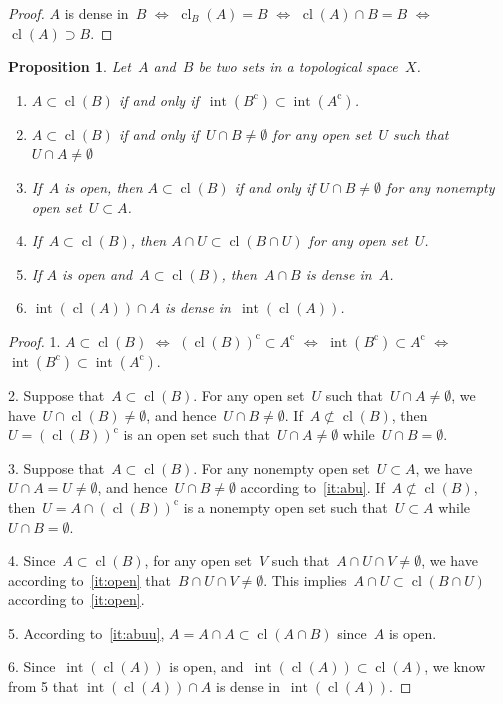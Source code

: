 \documentclass[11pt,a4paper]{article}  %
\newtheorem{proposition}{Proposition}[section]
\theoremstyle{definition}
\newcommand{\co}{{\mathrm{c}}}
\newcommand{\ie}{{i.e.}}
\DeclareMathOperator{\inter}{int}
\DeclareMathOperator{\cl}{cl}
\numberwithin{equation}{section}
\begin{document}
\begin{proof}
  $A$ is dense in~$B$ $\Leftrightarrow $ $\cl_B(A) = B$ $\Leftrightarrow$ $\cl(A)\cap B = B$
  $\Leftrightarrow$ $\cl(A) \supset B$.
\end{proof}

\begin{proposition}
  \label{prop:dense}
  Let~$A$ and~$B$ be two sets in a topological space~$X$.
  \begin{enumerate}
    \item $A\subset \cl(B)$ if and only if~$\inter(B^\co ) \subset \inter(A^\co)$.
    \item \label{it:abu} $A \subset \cl(B)$ if and only if~$U\cap B \neq \emptyset$ for any open
      set~$U$ such that~$U \cap  A \neq \emptyset$
    \item \label{it:open} If~$A$ is open, then $A\subset \cl(B)$ if and only if $U\cap B \neq \emptyset$ for any
    nonempty open set~$U\subset A$.
  \item \label{it:abuu} If~$A\subset \cl(B)$, then $A\cap U \subset \cl(B\cap U)$ for any open set~$U$.
   \item \label{it:dense}If $A$ is open and~$A\subset \cl(B)$, then~$A\cap B$ is dense in~$A$.
   \item \label{it:intcl} $\inter(\cl(A))\cap A$ is dense in~$\inter(\cl(A))$.
  \end{enumerate}
\end{proposition}

\begin{proof}
1. $A\subset \cl(B)$ $\Leftrightarrow$ $(\cl(B))^\co \subset A^\co $
$\Leftrightarrow$ $\inter(B^\co)  \subset A^\co$
$\Leftrightarrow$ $\inter(B^\co)  \subset \inter(A^\co)$.

2. Suppose that~$A\subset \cl(B)$. For any open set~$U$ such that~$U\cap A\neq \emptyset$, we
   have~$U\cap \cl(B)\neq \emptyset$, and hence~$U\cap B\neq \emptyset$.
   If~$A\not\subset \cl(B)$, then~$U=(\cl(B))^\co$ is an open set such that~$U\cap A \neq \emptyset$
   while~$U\cap B = \emptyset$.

3. Suppose that~$A\subset \cl(B)$. For any nonempty open set~$U\subset A$, we have~$U\cap A = U\neq \emptyset$,
and hence~$U\cap B\neq \emptyset$ according to~\ref{it:abu}.
   If~$A\not\subset \cl(B)$, then~$U=A\cap (\cl(B))^\co$ is a nonempty open set such that~$U\subset A$
   while~$U\cap B = \emptyset$.

4. Since~$A \subset \cl(B)$, for any open set~$V$ such that~$A\cap U\cap V\neq \emptyset$, we have
according to~\ref{it:open} that~$B\cap U\cap V\neq \emptyset$. This implies~$A\cap U \subset \cl(B\cap U)$
according to~\ref{it:open}.

5. According to~\ref{it:abuu}, $A = A\cap A \subset \cl(A\cap B)$ since~$A$ is open.

6. Since~$\inter(\cl(A))$ is open, and~$\inter(\cl(A)) \subset \cl(A)$, we know from 5 that
$\inter(\cl(A))\cap A$ is dense in~$\inter(\cl(A))$.
\end{proof}
\end{document}
